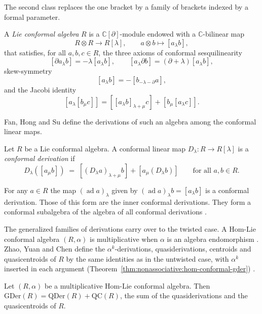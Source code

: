 The second class replaces the one bracket by a family of brackets indexed by
a formal parameter. %

\begin{definition}
\label{def:nonassociative:lie-conformal}
A \emph{Lie conformal algebra} $R$ is a $\mathbb{C}[\partial]$-module
endowed with a $\mathbb{C}$-bilinear map
\[
R\otimes R\to R[\lambda],\qquad a\otimes b\mapsto [a_\lambda b],
\]
that satisfies, for all $a,b,c\in R$, the three axioms of conformal
sesquilinearity
\[
[\partial a_\lambda b]=-\lambda[a_\lambda b],\qquad
[a_\lambda\partial b]=(\partial+\lambda)[a_\lambda b],
\]
skew-symmetry
\[
[a_\lambda b]=-[b_{-\lambda-\partial}a],
\]
and the Jacobi identity
\[
[a_\lambda[b_\mu c]]=[[a_\lambda b]_{\lambda+\mu}c]
+[b_\mu[a_\lambda c]].
\]
\end{definition}

Fan, Hong and Su define the derivations of such an algebra among the
conformal linear maps. %

\begin{definition}
\label{def:nonassociative:conformal-derivation}
Let $R$ be a Lie conformal algebra. A conformal linear map
$D_\lambda\colon R\to R[\lambda]$ is a \emph{conformal derivation} if
\[
D_\lambda([a_\mu b])\;=\;[(D_\lambda a)_{\lambda+\mu}b]
+[a_\mu(D_\lambda b)]
\qquad\text{for all }a,b\in R.
\]
\end{definition}

For any $a\in R$ the map $(\operatorname{ad} a)_\lambda$ given by
$(\operatorname{ad} a)_\lambda b=[a_\lambda b]$ is a conformal derivation.
Those of this form are the inner conformal derivations. They form a
conformal subalgebra of the algebra of all conformal derivations
\cite[Definition~2.7, p.~3]{FanHongSu2019}.

The generalized families of derivations carry over to the twisted case. A
Hom-Lie conformal algebra $(R,\alpha)$ is multiplicative when $\alpha$ is an
algebra endomorphism \cite[p.~3]{ZhaoYuanChen2018}. Zhao, Yuan and Chen define
the $\alpha^{k}$-derivations, quasiderivations, centroids and quasicentroids of
$R$ by the same identities as in the untwisted case, with $\alpha^{k}$ inserted
in each argument (Theorem~\ref{thm:nonassociative:hom-conformal-gder}) \cite[p.~16]{ZhaoYuanChen2018}.

\begin{theorem}\label{thm:nonassociative:hom-conformal-gder}
Let $(R,\alpha)$ be a multiplicative Hom-Lie conformal algebra. Then
$\mathrm{GDer}(R)=\mathrm{QDer}(R)+\mathrm{QC}(R)$, the sum of the
quasiderivations and the quasicentroids of $R$.
\end{theorem}

